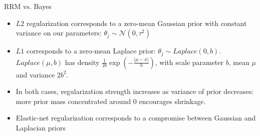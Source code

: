 \documentclass[11pt,compress,t,notes=noshow, xcolor=table]{beamer}
\begin{document}
\begin{vbframe} {RRM vs. Bayes}
\framebreak

\begin{figure}
  \centering
\end{figure}

{\footnotesize
\begin{itemize}
  \item $L2$ regularization corresponds to a zero-mean Gaussian prior with 
  constant variance on our parameters:
  $\theta_j \sim \mathcal{N}(0, \tau^2)$ 
  \item $L1$ corresponds to a zero-mean Laplace prior: 
  $\theta_j \sim \mathit{Laplace}(0,b)$.
  $\mathit{Laplace}(\mu, b)$ has density $\frac{1}{2b}\exp(-\frac{|\mu-x|}{b})$, 
  with scale parameter $b$, mean $\mu$ and variance $2b^2$.
  \item In both cases, regularization strength increases as  
  variance of prior decreases: more prior mass concentrated around 0 encourages shrinkage.
  \item Elastic-net regularization corresponds to a compromise between Gaussian and Laplacian priors 
\end{itemize}
 }
 
\end{vbframe}

\end{document}
